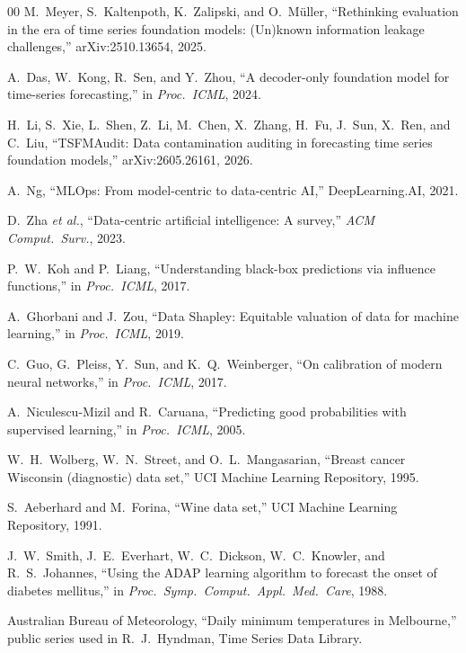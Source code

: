 \documentclass[conference]{IEEEtran}
\begin{document}
\begin{thebibliography}{00}
M.~Meyer, S.~Kaltenpoth, K.~Zalipski, and O.~M\"uller, ``Rethinking evaluation in the era of time series foundation models: (Un)known information leakage challenges,'' arXiv:2510.13654, 2025.

A.~Das, W.~Kong, R.~Sen, and Y.~Zhou, ``A decoder-only foundation model for time-series forecasting,'' in \emph{Proc.\ ICML}, 2024.

H.~Li, S.~Xie, L.~Shen, Z.~Li, M.~Chen, X.~Zhang, H.~Fu, J.~Sun, X.~Ren, and C.~Liu, ``TSFMAudit: Data contamination auditing in forecasting time series foundation models,'' arXiv:2605.26161, 2026.

A.~Ng, ``MLOps: From model-centric to data-centric AI,'' DeepLearning.AI, 2021.

D.~Zha \emph{et al.}, ``Data-centric artificial intelligence: A survey,'' \emph{ACM Comput.\ Surv.}, 2023.

P.~W.~Koh and P.~Liang, ``Understanding black-box predictions via influence functions,'' in \emph{Proc.\ ICML}, 2017.

A.~Ghorbani and J.~Zou, ``Data Shapley: Equitable valuation of data for machine learning,'' in \emph{Proc.\ ICML}, 2019.

C.~Guo, G.~Pleiss, Y.~Sun, and K.~Q.~Weinberger, ``On calibration of modern neural networks,'' in \emph{Proc.\ ICML}, 2017.

A.~Niculescu-Mizil and R.~Caruana, ``Predicting good probabilities with supervised learning,'' in \emph{Proc.\ ICML}, 2005.

W.~H.~Wolberg, W.~N.~Street, and O.~L.~Mangasarian, ``Breast cancer Wisconsin (diagnostic) data set,'' UCI Machine Learning Repository, 1995.

S.~Aeberhard and M.~Forina, ``Wine data set,'' UCI Machine Learning Repository, 1991.

J.~W.~Smith, J.~E.~Everhart, W.~C.~Dickson, W.~C.~Knowler, and R.~S.~Johannes, ``Using the ADAP learning algorithm to forecast the onset of diabetes mellitus,'' in \emph{Proc.\ Symp.\ Comput.\ Appl.\ Med.\ Care}, 1988.

Australian Bureau of Meteorology, ``Daily minimum temperatures in Melbourne,'' public series used in R.~J.~Hyndman, Time Series Data Library.


\end{thebibliography}
\end{document}
